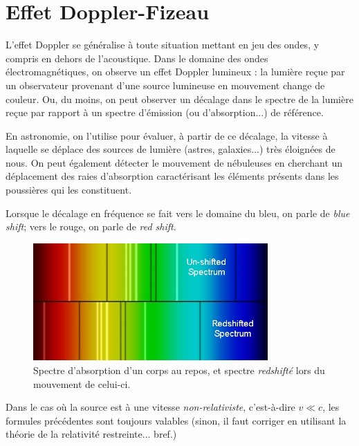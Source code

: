 \documentclass{article}
\theoremstyle{definition}
\begin{document}
\section{Effet Doppler-Fizeau}

L'effet Doppler se généralise à toute situation mettant en jeu des ondes, y compris en dehors de l'acoustique. Dans le domaine des ondes électromagnétiques, on observe un effet Doppler lumineux : la lumière reçue par un observateur provenant d'une source lumineuse en mouvement change de couleur. Ou, du moins, on peut observer un décalage dans le spectre de la lumière reçue par rapport à un spectre d'émission (ou d'absorption...) de référence.

En astronomie, on l'utilise pour évaluer, à partir de ce décalage, la vitesse à laquelle se déplace des sources de lumière (astres, galaxies...) très éloignées de nous. On peut également détecter le mouvement de nébuleuses en cherchant un déplacement des raies d'absorption caractérisant les éléments présents dans les poussières qui les constituent.

Lorsque le décalage en fréquence se fait vers le domaine du bleu, on parle de \textit{blue shift}; vers le rouge, on parle de \textit{red shift}.

\begin{figure}[h]
	\centering
	\includegraphics[width=0.8\textwidth]{redshift1.jpg}
	\caption{Spectre d'absorption d'un corps au repos, et spectre \textit{redshifté} lors du mouvement de celui-ci.}
\end{figure}

Dans le cas où la source est à une vitesse \textit{non-relativiste}, c'est-à-dire $v\ll c$, les formules précédentes sont toujours valables (sinon, il faut corriger en utilisant la théorie de la relativité restreinte... bref.)
\end{document}
